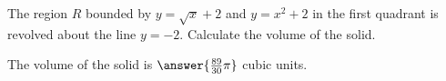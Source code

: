 \documentclass{ximera}
\author{Jim Talamo}
\begin{document}
\begin{exercise}

The region $R$ bounded by $y=\sqrt{x}+2$ and $y=x^2+2$ in the first quadrant is revolved about the line $y=-2$.  Calculate the volume of the solid.

The volume of the solid is $\answer{\frac{89}{30} \pi}$ cubic units.	
\end{exercise}
\end{document}
